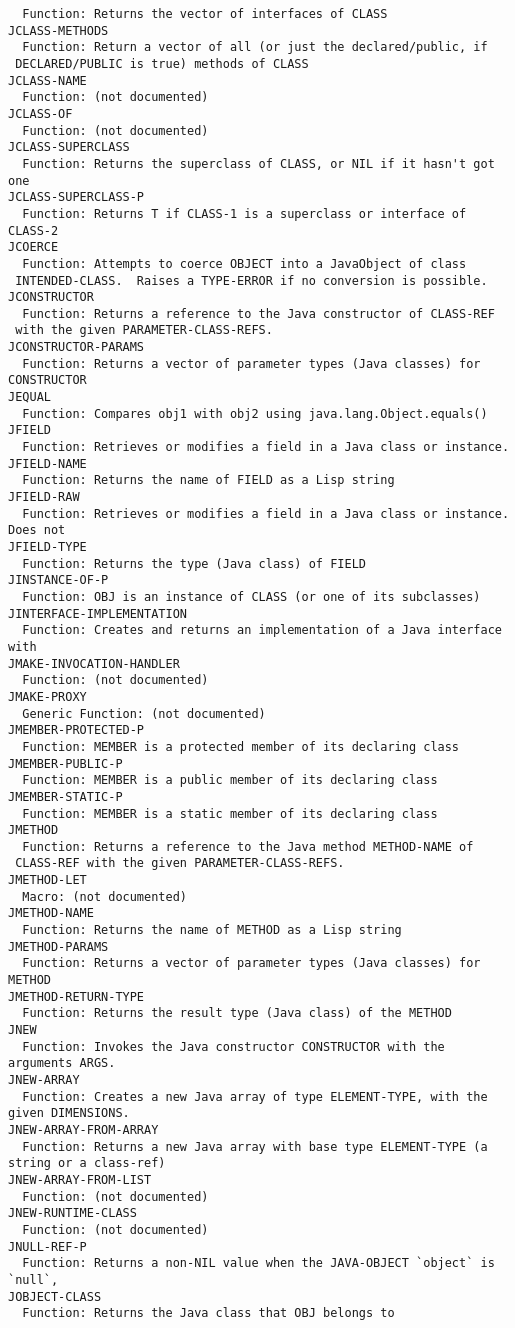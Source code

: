 \begin{verbatim}
  Function: Returns the vector of interfaces of CLASS
JCLASS-METHODS
  Function: Return a vector of all (or just the declared/public, if
 DECLARED/PUBLIC is true) methods of CLASS
JCLASS-NAME
  Function: (not documented)
JCLASS-OF
  Function: (not documented)
JCLASS-SUPERCLASS
  Function: Returns the superclass of CLASS, or NIL if it hasn't got one
JCLASS-SUPERCLASS-P
  Function: Returns T if CLASS-1 is a superclass or interface of CLASS-2
JCOERCE
  Function: Attempts to coerce OBJECT into a JavaObject of class
 INTENDED-CLASS.  Raises a TYPE-ERROR if no conversion is possible.
JCONSTRUCTOR
  Function: Returns a reference to the Java constructor of CLASS-REF
 with the given PARAMETER-CLASS-REFS.
JCONSTRUCTOR-PARAMS
  Function: Returns a vector of parameter types (Java classes) for CONSTRUCTOR
JEQUAL
  Function: Compares obj1 with obj2 using java.lang.Object.equals()
JFIELD
  Function: Retrieves or modifies a field in a Java class or instance.
JFIELD-NAME
  Function: Returns the name of FIELD as a Lisp string
JFIELD-RAW
  Function: Retrieves or modifies a field in a Java class or instance. Does not
JFIELD-TYPE
  Function: Returns the type (Java class) of FIELD
JINSTANCE-OF-P
  Function: OBJ is an instance of CLASS (or one of its subclasses)
JINTERFACE-IMPLEMENTATION
  Function: Creates and returns an implementation of a Java interface with
JMAKE-INVOCATION-HANDLER
  Function: (not documented)
JMAKE-PROXY
  Generic Function: (not documented)
JMEMBER-PROTECTED-P
  Function: MEMBER is a protected member of its declaring class
JMEMBER-PUBLIC-P
  Function: MEMBER is a public member of its declaring class
JMEMBER-STATIC-P
  Function: MEMBER is a static member of its declaring class
JMETHOD
  Function: Returns a reference to the Java method METHOD-NAME of
 CLASS-REF with the given PARAMETER-CLASS-REFS.
JMETHOD-LET
  Macro: (not documented)
JMETHOD-NAME
  Function: Returns the name of METHOD as a Lisp string
JMETHOD-PARAMS
  Function: Returns a vector of parameter types (Java classes) for METHOD
JMETHOD-RETURN-TYPE
  Function: Returns the result type (Java class) of the METHOD
JNEW
  Function: Invokes the Java constructor CONSTRUCTOR with the arguments ARGS.
JNEW-ARRAY
  Function: Creates a new Java array of type ELEMENT-TYPE, with the given DIMENSIONS.
JNEW-ARRAY-FROM-ARRAY
  Function: Returns a new Java array with base type ELEMENT-TYPE (a string or a class-ref)
JNEW-ARRAY-FROM-LIST
  Function: (not documented)
JNEW-RUNTIME-CLASS
  Function: (not documented)
JNULL-REF-P
  Function: Returns a non-NIL value when the JAVA-OBJECT `object` is `null`,
JOBJECT-CLASS
  Function: Returns the Java class that OBJ belongs to

\end{verbatim}
